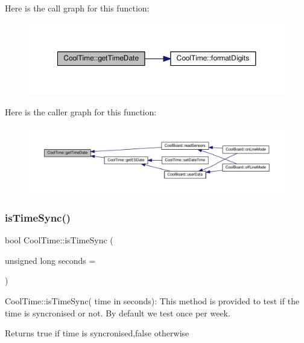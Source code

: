 Here is the call graph for this function\+:
\nopagebreak
\begin{figure}[H]
\begin{center}
\leavevmode
\includegraphics[width=350pt]{class_cool_time_a7a7501c5ca77dd1248bea704c44f986c_cgraph}
\end{center}
\end{figure}
Here is the caller graph for this function\+:
\nopagebreak
\begin{figure}[H]
\begin{center}
\leavevmode
\includegraphics[width=350pt]{class_cool_time_a7a7501c5ca77dd1248bea704c44f986c_icgraph}
\end{center}
\end{figure}
\mbox{\label{class_cool_time_a5ae038a4498602b189f76a10bf02adf8}} 
\subsubsection{\texorpdfstring{is\+Time\+Sync()}{isTimeSync()}}
{\footnotesize\ttfamily bool Cool\+Time\+::is\+Time\+Sync (\begin{DoxyParamCaption}\item[{unsigned long}]{seconds = {} }\end{DoxyParamCaption})}

Cool\+Time\+::is\+Time\+Sync( time in seconds)\+: This method is provided to test if the time is syncronised or not. By default we test once per week.

\begin{DoxyReturn}{Returns}
true if time is syncronised,false otherwise 
\end{DoxyReturn}


